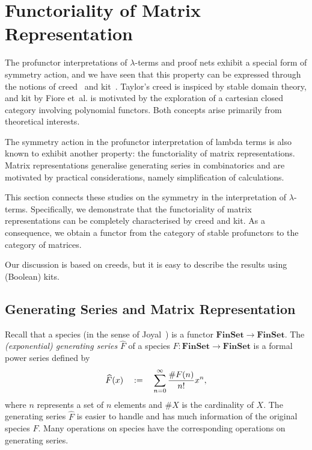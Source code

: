 \section{Functoriality of Matrix Representation}
\label{sec:matrix}
The profunctor interpretations of \( \lambda \)-terms and proof nets exhibit a special form of symmetry action, and we have seen that this property can be expressed through the notions of creed~\cite{Taylor1989} and kit~\cite{Fiore2024}.
Taylor's creed is inspiced by stable domain theory, and kit by Fiore et~al.{} is motivated by the exploration of a cartesian closed category involving polynomial functors.
Both concepts arise primarily from theoretical interests.

The symmetry action in the profunctor interpretation of lambda terms is also known to exhibit another property: the functoriality of matrix representations. Matrix representations generalise generating series in combinatorics and are motivated by practical considerations, namely simplification of calculations.

This section connects these studies on the symmetry in the interpretation of \( \lambda \)-terms.
Specifically, we demonstrate that the functoriality of matrix representations can be completely characterised by creed and kit.
As a consequence, we obtain a functor from the category of stable profunctors to the category of matrices.

Our discussion is based on creeds, but it is easy to describe the results using (Boolean) kits.


\newcommand{\MatTrans}[1]{\mathcal{M}({#1})}
\newcommand{\rsem}[1]{(\!|{#1}|\!)}
\newcommand{\SProf}{\mathbf{SProf}}
\newcommand{\WRel}{\mathbf{WRel}}



\tk{to do: define \( \SProf_\omega \)}



\subsection{Generating Series and Matrix Representation}
\newcommand{\FinSet}{\mathbf{FinSet}}

Recall that a species (in the sense of Joyal~\cite{Joyal1983?}) is a functor \( \FinSet \longrightarrow \FinSet \).
The \emph{(exponential) generating series} \( \widehat{F} \) of a species \( F \colon \FinSet \longrightarrow \FinSet \) is a formal power series defined by
\begin{equation*}
    \widehat{F}(x)
    \quad:=\quad
    \sum_{n = 0}^{\infty} \dfrac{\# F(n)}{n!} x^n,
\end{equation*}
where \( n \) represents a set of \( n \) elements and \( \# X \) is the cardinality of \( X \).
The generating series \( \widehat{F} \) is easier to handle and has much information of the original species \( F \).
Many operations on species have the corresponding operations on generating series.

